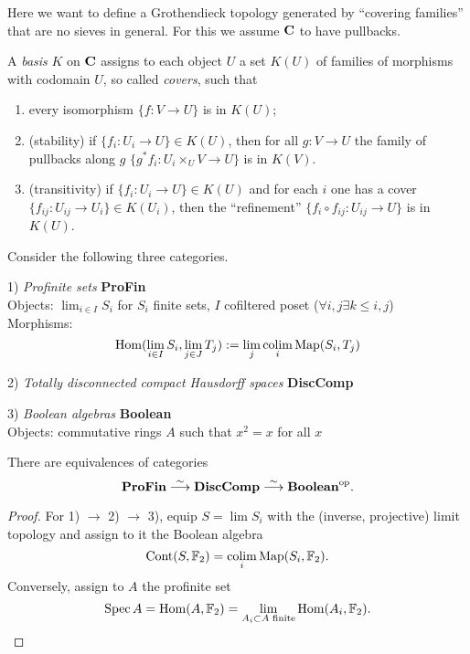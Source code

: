 \documentclass{notes}
\begin{document}
{Here we want to define a Grothendieck topology generated by ``covering families'' that are no sieves in general. For this we assume $\mathbf{C}$ to have pullbacks.

\begin{definition}
	A \emph{basis} $K$ on $\mathbf{C}$ assigns to each object $U$ a set $K(U)$ of families of morphisms with codomain $U$, so called \emph{covers}, such that
	\begin{enumerate}
		\item every isomorphism $\{f : V \rightarrow U\}$ is in $K(U)$;
		\item (stability) if $\{f_i : U_i \rightarrow U\} \in K(U)$, then for all $g : V \rightarrow U$ the family of pullbacks along $g$ $\{g^*f_i : U_i \times_U V \rightarrow U\}$
		is in $K(V)$.
		\item (transitivity) if $\{f_i : U_i \rightarrow U\} \in K(U)$ and for each $i$ one has a cover $\{f_{ij} : U_{ij} \rightarrow U_i\} \in K(U_i)$, then the ``refinement'' $\{f_i \circ f_{ij} : U_{ij} \rightarrow U\}$ is in $K(U)$.
	\end{enumerate}
\end{definition}
}

Consider the following three categories.

1) {\em Profinite sets} {\bf ProFin} \\
Objects: $\lim_{i\in I}S_i$ for $S_i$ finite sets, $I$ cofiltered poset
($\forall i,j \exists k\leq i,j$)
\\
Morphisms: 
$$
  \mathrm{Hom}(\lim_{i\in I}S_i,\lim_{j\in J}T_j) := \lim_j\operatorname*{colim}_i{\rm Map}(S_i,T_j)
$$

2) {\em Totally disconnected compact Hausdorff spaces} {\bf DiscComp}

3) {\em Boolean algebras} {\bf Boolean} \\ 
Objects: commutative rings $A$ such that $x^2=x$ for all $x$ 

\begin{prop}
There are equivalences of categories
$$
  \textbf{ProFin} \stackrel{\sim}\longrightarrow 
  \textbf{DiscComp} \stackrel{\sim}\longrightarrow  
  \textbf{Boolean}^{\rm op}.
$$
\end{prop}

\begin{proof}
For 1) $\to$ 2) $\to$ 3), equip $S=\lim S_i$ with the (inverse,
projective) limit topology and assign to it the Boolean algebra
$$
   {\rm Cont}(S,{\mathbb{F}}_2) = \operatorname*{colim}_i{\rm Map}(S_i,{\mathbb{F}}_2).
$$
Conversely, assign to $A$ the profinite set
$$
  \operatorname{Spec} A = \mathrm{Hom}(A,{\mathbb{F}}_2) = \lim_{A_i\subset A\text{ finite}}\mathrm{Hom}(A_i,{\mathbb{F}}_2).
$$
\end{proof}
\end{document}

